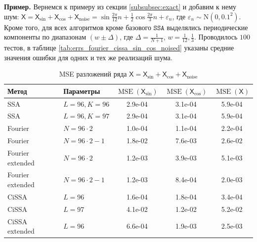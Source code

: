 \documentclass[12pt, specialist, subf
]{disser}
\theoremstyle{definition}
\newcommand{\SSA}{\texttt{SSA}}
\newcommand{\TS}{\mathsf{X}}
\begin{document}
\textbf{\large{Пример.}} Вернемся к примеру из секции \ref{subsubsec:exact} и добавим к нему шум: $\TS = \TS_{\sin} + \TS_{\cos} + \TS_{\mathrm{noise}} = \sin{\frac{2\pi}{12}n} + \frac{1}{2}\cos{\frac{2\pi}{3}n} + \varepsilon_n$, где $\varepsilon_n \sim \mathrm N(0, 0.1^2)$.
Кроме того, для всех алгоритмов кроме базового $\SSA$ выделялись периодические компоненты по диапазонам $\left(w \pm \Delta \right)$, где $\Delta = \frac{1}{N+1}$, $w = \frac{1}{12}, \frac{1}{3}$.
Проводилось $100$ тестов, в таблице \ref{tab:errs_fourier_cissa_sin_cos_noised} указаны средние значения ошибки для одних и тех же реализаций шума.
\begin{table}[H]
	\caption{MSE разложений ряда $\TS = \TS_{\sin} + \TS_{\cos} +\TS_{\mathrm{noise}}$ }
	\centering
	\begin{tabular}{l|l|ccc}
		\hline
		Метод              & Параметры            & $\operatorname{MSE}(\TS_{\sin})$ & $\operatorname{MSE}(\TS_{\cos})$ & $\operatorname{MSE}(\TS)$ \\
		\hline
		SSA                & $L = 96, K = 96 $    & 2.9e-04                          & 3.1e-04                          & 5.9e-04                   \\
		SSA                & $L = 96, K = 97 $    & 2.9e-04                          & 3.1e-04                          & 5.9e-04                   \\
		\hline
		Fourier            & $N = 96 \cdot 2$     & 1.0e-04                          & 1.1e-04                          & 2.2e-04                   \\
		Fourier            & $N = 96 \cdot 2 - 1$ & 1.8e-02                          & 7.6e-03                          & 2.6e-02                   \\
		\hline
		Fourier extended   & $N = 96 \cdot 2$     & 1.2e-03                          & 3.9e-03                          & 5.1e-03                   \\
		Fourier extended   & $N = 96 \cdot 2 - 1$ & 1.2e-03                          & 8.4e-04                          & 2.0e-03                   \\
		\hline
		CiSSA              & $L = 96$             & 1.6e-04                          & 1.8e-04                          & 3.4e-04                   \\
		CiSSA              & $L = 97$             & 4.1e-02                          & 1.2e-02                          & 5.2e-02                   \\
		\hline
		CiSSA extended     & $L = 96$             & 6.6e-04                          & 1.9e-03                          & 2.5e-03                   \\

\end{tabular}
\end{table}
\end{document}
